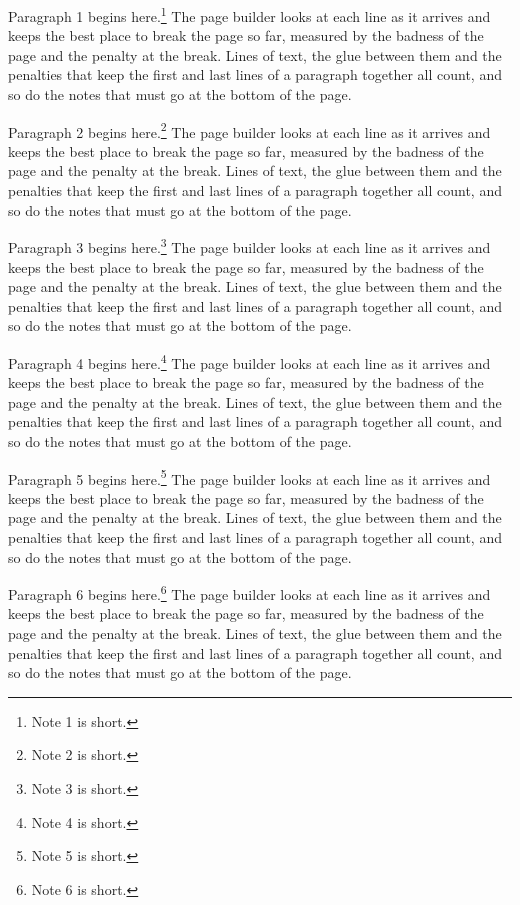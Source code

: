 \documentclass[12pt]{book}
\begin{document}
Paragraph 1 begins here.\footnote{Note 1 is short.} The page builder looks at each line as it arrives and keeps the best place to break the page so far, measured by the badness of the page and the penalty at the break. Lines of text, the glue between them and the penalties that keep the first and last lines of a paragraph together all count, and so do the notes that must go at the bottom of the page.

Paragraph 2 begins here.\footnote{Note 2 is short.} The page builder looks at each line as it arrives and keeps the best place to break the page so far, measured by the badness of the page and the penalty at the break. Lines of text, the glue between them and the penalties that keep the first and last lines of a paragraph together all count, and so do the notes that must go at the bottom of the page.

Paragraph 3 begins here.\footnote{Note 3 is short.} The page builder looks at each line as it arrives and keeps the best place to break the page so far, measured by the badness of the page and the penalty at the break. Lines of text, the glue between them and the penalties that keep the first and last lines of a paragraph together all count, and so do the notes that must go at the bottom of the page.

Paragraph 4 begins here.\footnote{Note 4 is short.} The page builder looks at each line as it arrives and keeps the best place to break the page so far, measured by the badness of the page and the penalty at the break. Lines of text, the glue between them and the penalties that keep the first and last lines of a paragraph together all count, and so do the notes that must go at the bottom of the page.

Paragraph 5 begins here.\footnote{Note 5 is short.} The page builder looks at each line as it arrives and keeps the best place to break the page so far, measured by the badness of the page and the penalty at the break. Lines of text, the glue between them and the penalties that keep the first and last lines of a paragraph together all count, and so do the notes that must go at the bottom of the page.

Paragraph 6 begins here.\footnote{Note 6 is short.} The page builder looks at each line as it arrives and keeps the best place to break the page so far, measured by the badness of the page and the penalty at the break. Lines of text, the glue between them and the penalties that keep the first and last lines of a paragraph together all count, and so do the notes that must go at the bottom of the page.
\end{document}

